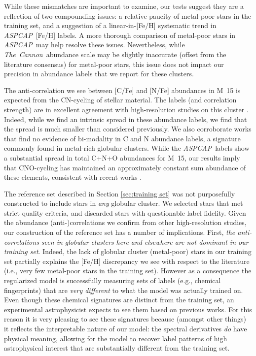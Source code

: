 \documentclass[12pt,preprint]{aastex6}
\newcommand{\project}[1]{\textsl{#1}}
\newcommand{\TheCannon}{\project{The~Cannon}}
\newcommand{\acronym}[1]{{\small{#1}}}
\newcommand{\aspcap}{\project{\acronym{ASPCAP}}}
\begin{document}
While these mismatches are important to examine, our tests suggest they
are a reflection of two compounding issues: a relative paucity of metal-poor
stars in the training set, and a suggestion of a linear-in-[Fe/H] systematic
trend in \aspcap\ [Fe/H] labels.  A more thorough comparison of metal-poor
stars in \aspcap\ may help resolve these issues.  Nevertheless, while
\TheCannon\ abundance scale may be slightly inaccurate (offset from the
literature consensus) for metal-poor stars, this issue does not impact
our precision in abundance labels that we report for these clusters.  


The anti-correlation we see between [C/Fe] and [N/Fe] abundances in M~15 is
expected from the CN-cycling of stellar material.  The labels (and correlation
strength) are in excellent agreement with high-resolution studies on this cluster
\citep{Cohen_2005}.  Indeed, while we find an intrinsic spread in these abundance
labels, we find that the spread is much smaller than considered previously.  We also
corroborate works that find no evidence of bi-modality in C and N 
abundance labels, a signature commonly found in metal-rich globular clusters.
While the \aspcap\ labels show a substantial spread in total C+N+O abundances
for M~15, our results imply that CNO-cycling has maintained an approximately
constant sum abundance of these elements, consistent with recent works
\citep{Meszaros_2015}.


The reference set described in Section \ref{sec:training set} was not
purposefully constructed to include stars in \emph{any} globular
cluster.  We selected stars that met strict quality criteria, and
discarded stars with questionable label fidelity.  Given the
abundance (anti-)correlations we confirm from other high-resolution
studies, our construction of the reference set has a number of
implications.  First, \emph{the anti-correlations seen in globular 
clusters here and elsewhere are not dominant in our training set}.
Indeed, the lack of globular cluster (metal-poor) stars in our 
training set partially explains the [Fe/H] discrepancy we see with
respect to the literature (i.e., very few metal-poor stars in the
training set).  However as a consequence the regularized model is 
successfully measuring sets of labels (e.g., chemical fingerprints) that are 
\emph{very different} to what the model was actually trained on.  
Even though these chemical signatures are distinct from the training
set, an experimental astrophysicist expects to see them based on previous works.  For this
reason it is very pleasing to see these signatures because (amongst
other things) it reflects the interpretable nature of our model: the spectral
derivatives \emph{do} have physical meaning, allowing for the model
to recover label patterns of high astrophysical interest that are 
substantially different from the training set.
\end{document}
